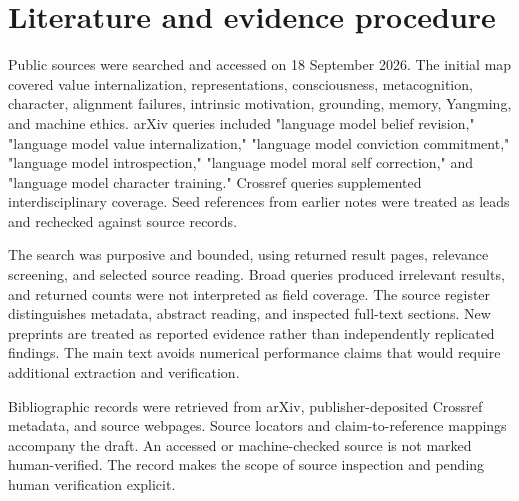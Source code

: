 \documentclass[11pt]{article}
\begin{document}
\appendix

\section{Literature and evidence procedure}

Public sources were searched and accessed on 18 September 2026. The initial map covered value internalization, representations, consciousness, metacognition, character, alignment failures, intrinsic motivation, grounding, memory, Yangming, and machine ethics. arXiv queries included "language model belief revision," "language model value internalization," "language model conviction commitment," "language model introspection," "language model moral self correction," and "language model character training." Crossref queries supplemented interdisciplinary coverage. Seed references from earlier notes were treated as leads and rechecked against source records.

The search was purposive and bounded, using returned result pages, relevance screening, and selected source reading. Broad queries produced irrelevant results, and returned counts were not interpreted as field coverage. The source register distinguishes metadata, abstract reading, and inspected full-text sections. New preprints are treated as reported evidence rather than independently replicated findings. The main text avoids numerical performance claims that would require additional extraction and verification.

Bibliographic records were retrieved from arXiv, publisher-deposited Crossref metadata, and source webpages. Source locators and claim-to-reference mappings accompany the draft. An accessed or machine-checked source is not marked human-verified. The record makes the scope of source inspection and pending human verification explicit.



\clearpage


\end{document}
